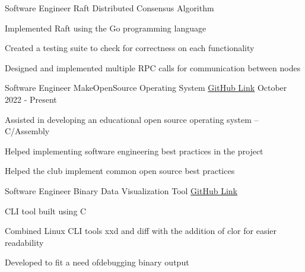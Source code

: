 

\begin{cventries}

  \cventry
    {Software Engineer} %
    {Raft Distributed Consensus Algorithm} %
    {} %
    {} %
    {
      \begin{cvitems} %
        \item Implemented Raft using the Go programming language
        \item Created a testing suite to check for correctness on each functionality
	\item Designed and implemented multiple RPC calls for communication between nodes
      \end{cvitems}
    }


  \cventry
    {Software Engineer} %
    {MakeOpenSource Operating System} %
    {\href{https://github.com/makeopensource/mOS}{GitHub Link}} %
    {October 2022 - Present} %
    {
      \begin{cvitems} %
        \item Assisted in developing an educational open source operating system -- C/Assembly
        \item Helped implementing software engineering best practices in the project
        \item Helped the club implement common open source best practices
      \end{cvitems}
    }
  \cventry
    {Software Engineer} %
    {Binary Data Visualization Tool} %
    {\href{https://github.com/shawnz99/bdt}{GitHub Link}} %
    {} %
    {
      \begin{cvitems} %
        \item CLI tool built using C
        \item Combined Linux CLI tools xxd and diff with the addition of clor for easier readability
        \item Developed to fit a need ofdebugging binary output
      \end{cvitems}
    }



\end{cventries}
